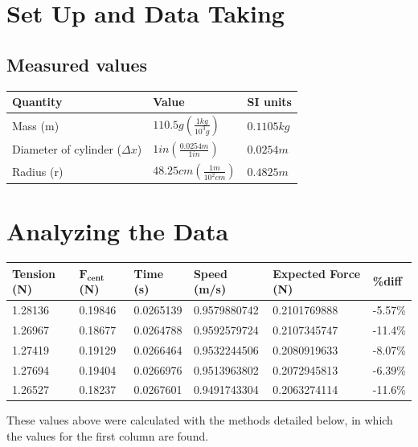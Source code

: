 \documentclass[11pt, letterpaper, includehead]{article}
\renewcommand{\arraystretch}{1.2}
\begin{document}
\section{Set Up and Data Taking}


\renewcommand{\arraystretch}{2} 
\subsection{Measured values}
\begin{center}
  \begin{tabular}{|  m{5cm} | m{4cm} | m{3cm} | }
    \hline
    \textbf{Quantity} & \textbf{Value} & \textbf{SI units} \\
    \hline
    Mass  (m)  & $110.5g\left( \frac{1kg}{10^3g}\right)$ & $0.1105 kg$  \\
    \hline
    Diameter of cylinder ($\Delta x$) & $1in\left( \frac{0.0254m}{1in}\right)$ & $0.0254 m$  \\
    \hline
    Radius (r) & $48.25 cm \left( \frac{1m}{10^2cm}\right)$ & $0.4825 m$  \\
    \hline
  \end{tabular}
\end{center}
\renewcommand{\arraystretch}{1.5}

\section{Analyzing the Data}
\begin{center} 
  \begin{tabular}{|m{2.3cm}| m{1.7cm} | m{1.7cm} | m{2.4cm} | m{3.8cm} | m{1.2cm} |} 
    \hline
    \textbf{Tension (N)} & $\mathbf{F_{cent}}$ \textbf{(N)} & \textbf{Time (s)} & \textbf{Speed (m/s)} & \textbf{Expected Force (N)} & \textbf{\%diff}\\ 
    \hline
    1.28136 & 0.19846 & 0.0265139 & 0.9579880742 & 0.2101769888 & -5.57\%\\ 
    \hline
    1.26967 & 0.18677 & 0.0264788 & 0.9592579724 & 0.2107345747 & -11.4\%\\ 
    \hline
    1.27419 & 0.19129 & 0.0266464 & 0.9532244506 & 0.2080919633 & -8.07\%\\ 
    \hline
    1.27694 & 0.19404 & 0.0266976 & 0.9513963802 & 0.2072945813 & -6.39\%\\ 
    \hline
    1.26527 & 0.18237 & 0.0267601 & 0.9491743304 & 0.2063274114 & -11.6\%\\ 
    \hline
  \end{tabular} 
\end{center}
These values above were calculated with the methods detailed below, in which the values for the first column are found.
\end{document}
